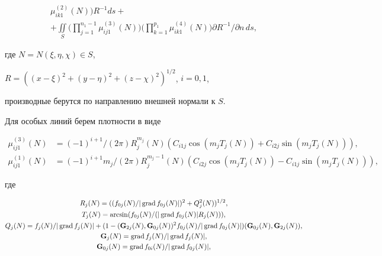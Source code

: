 \begin{pf}
\begin{multline}
\mu^{(2)}_{i k 1}(N)\bigg)R^{-1}d s+ \\ +\iint\limits_S\bigg( 


\prod^{n_1-1}_{j=1}\mu^{(3)}_{i j 1}(N)\bigg)\bigg( 


\prod^{p_1}_{k=1}\mu^{(4)}_{i k1}(N)\bigg)\partial R^{-1}/ 


\partial n\,d s, 


\end{multline} 


где $N=N(\xi,\eta,\chi)\in S$, 


$R=((x-\xi)^2+(y-\eta)^2+(z-\chi)^2)^{1/2}$, $i=0,1$, 


производные берутся по направлению внешней нормали к $S$. 


 


Для особых линий берем плотности в виде 


\begin{align} 


\mu^{(3)}_{i j1}(N)&=(-1)^{i+1}/(2\pi)R^{m_j}_j(N) 


(C_{i1j}\cos(m_j T_j(N))+C_{i2j}\sin(m_j T_j(N))),\\ 


\mu^{(1)}_{i j1}(N)&=(-1)^{i+1}m_j/(2\pi)R^{m_j-1}_j(N) 


(C_{i2j}\cos(m_j T_j(N))- 


C_{i1j}\sin(m_j T_j(N))), 


\end{align} 


где 


\begin{gather*} 


R_j(N)=((f_{0j}(N)/|\Grad f_{0j}(N)|)^2+ 


Q^2_j(N))^{1/2},\\ 


T_j(N)=\arcsin(f_{0j}(N)/(|\Grad f_{0j}(N)|R_j(N))),\\ 


Q_j(N)=f_j(N)/|\Grad f_j(N)|+(1-(\bold G_{2j}(N), 


\bold G_{0j}(N))^2f_{0j}(N)/|\Grad f_{0j}(N)|) 


(\bold G_{0j}(N),\bold G_{2j}(N)), \\ 


\bold G_j(N)=\Grad f_j(N)/|\Grad f_j(N)|, \\ 


\bold G_{0j}(N)=\Grad f_{0i}(N)/|\Grad f_{0j}(N)|, \\ 



\end{gather*}
\end{pf}
